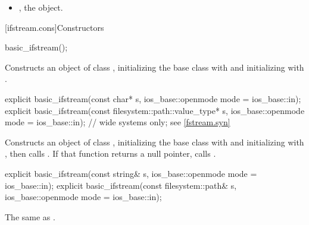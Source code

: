 \begin{itemize}
\item
{}, the  object.
\end{itemize}

[ifstream.cons]{Constructors}

%
\begin{itemdecl}
basic_ifstream();
\end{itemdecl}

\begin{itemdescr}
\pnum
\effects
Constructs an object of class
,
initializing the base class with
and initializing  with
.
\end{itemdescr}

%
\begin{itemdecl}
explicit basic_ifstream(const char* s,
                        ios_base::openmode mode = ios_base::in);
explicit basic_ifstream(const filesystem::path::value_type* s,
                        ios_base::openmode mode = ios_base::in);  // wide systems only; see \ref{fstream.syn}
\end{itemdecl}

\begin{itemdescr}
\pnum
\effects
Constructs an object of class
,
initializing the base class with
and initializing  with
,
then calls
.
If that function returns a null pointer, calls
.
\end{itemdescr}

%
\begin{itemdecl}
explicit basic_ifstream(const string& s,
                        ios_base::openmode mode = ios_base::in);
explicit basic_ifstream(const filesystem::path& s,
                        ios_base::openmode mode = ios_base::in);
\end{itemdecl}

\begin{itemdescr}
\pnum
\effects The same as .
\end{itemdescr}

